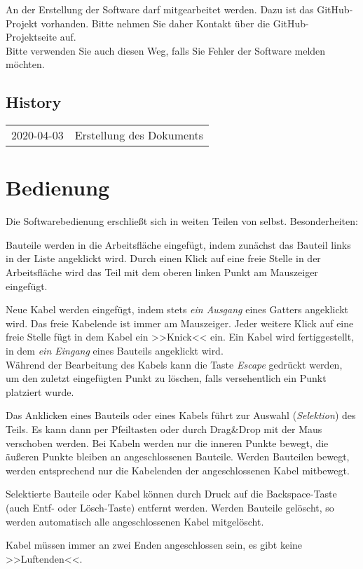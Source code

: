 \documentclass[12pt]{scrartcl}
\begin{document}
An der Erstellung der Software darf mitgearbeitet werden. Dazu ist das GitHub-Projekt vorhanden. Bitte nehmen Sie daher Kontakt über die GitHub-Projektseite auf.\\

Bitte verwenden Sie auch diesen Weg, falls Sie Fehler der Software melden möchten.\\

\subsection{History}
\begin{tabular}{p{4cm}p{10cm}}
2020-04-03 & Erstellung des Dokuments\\
\end{tabular}

\section{Bedienung}
Die Softwarebedienung erschließt sich in weiten Teilen von selbst. Besonderheiten:
\begin{compactitem}
\item Bauteile werden in die Arbeitsfläche eingefügt, indem zunächst das Bauteil links in der Liste angeklickt wird. Durch einen Klick auf eine freie Stelle in der Arbeitsfläche wird das Teil mit dem oberen linken Punkt am Mauszeiger eingefügt.
\item Neue Kabel werden eingefügt, indem stets \textit{ein Ausgang} eines Gatters angeklickt wird. Das freie Kabelende ist immer am Mauszeiger. Jeder weitere Klick auf eine freie Stelle fügt in dem Kabel ein >>Knick<< ein. Ein Kabel wird fertiggestellt, in dem \textit{ein Eingang} eines Bauteils angeklickt wird.\\
Während der Bearbeitung des Kabels kann die Taste \textit{Escape} gedrückt werden, um den zuletzt eingefügten Punkt zu löschen, falls versehentlich ein Punkt platziert wurde.
\item Das Anklicken eines Bauteils oder eines Kabels führt zur Auswahl (\textit{Selektion}) des Teils. Es kann dann per Pfeiltasten oder durch Drag\&Drop mit der Maus verschoben werden. Bei Kabeln werden nur die inneren Punkte bewegt, die äußeren Punkte bleiben an angeschlossenen Bauteile. Werden Bauteilen bewegt, werden entsprechend nur die Kabelenden der angeschlossenen Kabel mitbewegt.
\item Selektierte Bauteile oder Kabel können durch Druck auf die Backspace-Taste (auch Entf- oder Lösch-Taste) entfernt werden. Werden Bauteile gelöscht, so werden automatisch alle angeschlossenen Kabel mitgelöscht.
\item Kabel müssen immer an zwei Enden angeschlossen sein, es gibt keine >>Luftenden<<.
\end{compactitem}
\end{document}
